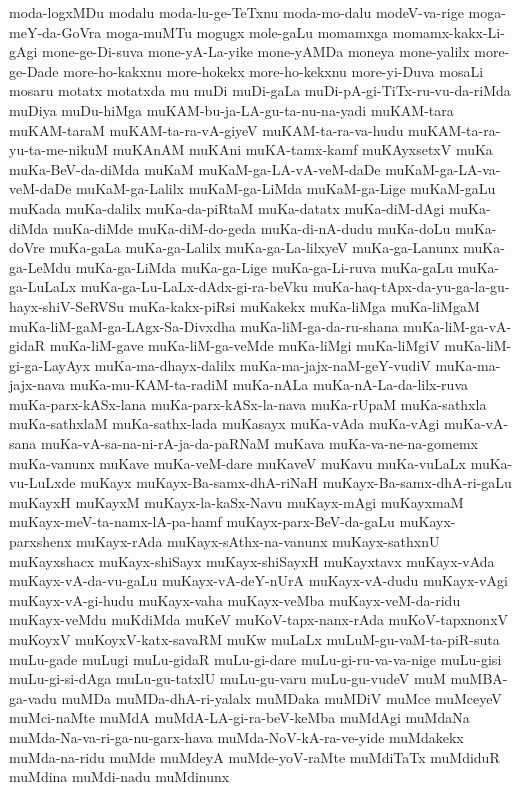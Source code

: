 {moda-logxMDu
modalu
moda-lu-ge-TeTxnu
moda-mo-dalu
modeV-va-rige
moga-meY-da-GoVra
moga-muMTu
mogugx
mole-gaLu
momamxga
momamx-kakx-Li-gAgi
mone-ge-Di-suva
mone-yA-La-yike
mone-yAMDa
moneya
mone-yalilx
more-ge-Dade
more-ho-kakxnu
more-hokekx
more-ho-kekxnu
more-yi-Duva
mosaLi
mosaru
motatx
motatxda
mu
muDi
muDi-gaLa
muDi-pA-gi-TiTx-ru-vu-da-riMda
muDiya
muDu-hiMga
muKAM-bu-ja-LA-gu-ta-nu-na-yadi
muKAM-tara
muKAM-taraM
muKAM-ta-ra-vA-giyeV
muKAM-ta-ra-va-hudu
muKAM-ta-ra-yu-ta-me-nikuM
muKAnAM
muKAni
muKA-tamx-kamf
muKAyxsetxV
muKa
muKa-BeV-da-diMda
muKaM
muKaM-ga-LA-vA-veM-daDe
muKaM-ga-LA-va-veM-daDe
muKaM-ga-Lalilx
muKaM-ga-LiMda
muKaM-ga-Lige
muKaM-gaLu
muKada
muKa-dalilx
muKa-da-piRtaM
muKa-datatx
muKa-diM-dAgi
muKa-diMda
muKa-diMde
muKa-diM-do-geda
muKa-di-nA-dudu
muKa-doLu
muKa-doVre
muKa-gaLa
muKa-ga-Lalilx
muKa-ga-La-lilxyeV
muKa-ga-Lanunx
muKa-ga-LeMdu
muKa-ga-LiMda
muKa-ga-Lige
muKa-ga-Li-ruva
muKa-gaLu
muKa-ga-LuLaLx
muKa-ga-Lu-LaLx-dAdx-gi-ra-beVku
muKa-haq-tApx-da-yu-ga-la-gu-hayx-shiV-SeRVSu
muKa-kakx-piRsi
muKakekx
muKa-liMga
muKa-liMgaM
muKa-liM-gaM-ga-LAgx-Sa-Divxdha
muKa-liM-ga-da-ru-shana
muKa-liM-ga-vA-gidaR
muKa-liM-gave
muKa-liM-ga-veMde
muKa-liMgi
muKa-liMgiV
muKa-liM-gi-ga-LayAyx
muKa-ma-dhayx-dalilx
muKa-ma-jajx-naM-geY-vudiV
muKa-ma-jajx-nava
muKa-mu-KAM-ta-radiM
muKa-nALa
muKa-nA-La-da-lilx-ruva
muKa-parx-kASx-lana
muKa-parx-kASx-la-nava
muKa-rUpaM
muKa-sathxla
muKa-sathxlaM
muKa-sathx-lada
muKasayx
muKa-vAda
muKa-vAgi
muKa-vA-sana
muKa-vA-sa-na-ni-rA-ja-da-paRNaM
muKava
muKa-va-ne-na-gomemx
muKa-vanunx
muKave
muKa-veM-dare
muKaveV
muKavu
muKa-vuLaLx
muKa-vu-LuLxde
muKayx
muKayx-Ba-samx-dhA-riNaH
muKayx-Ba-samx-dhA-ri-gaLu
muKayxH
muKayxM
muKayx-la-kaSx-Navu
muKayx-mAgi
muKayxmaM
muKayx-meV-ta-namx-lA-pa-hamf
muKayx-parx-BeV-da-gaLu
muKayx-parxshenx
muKayx-rAda
muKayx-sAthx-na-vanunx
muKayx-sathxnU
muKayxshacx
muKayx-shiSayx
muKayx-shiSayxH
muKayxtavx
muKayx-vAda
muKayx-vA-da-vu-gaLu
muKayx-vA-deY-nUrA
muKayx-vA-dudu
muKayx-vAgi
muKayx-vA-gi-hudu
muKayx-vaha
muKayx-veMba
muKayx-veM-da-ridu
muKayx-veMdu
muKdiMda
muKeV
muKoV-tapx-nanx-rAda
muKoV-tapxnonxV
muKoyxV
muKoyxV-katx-savaRM
muKw
muLaLx
muLuM-gu-vaM-ta-piR-suta
muLu-gade
muLugi
muLu-gidaR
muLu-gi-dare
muLu-gi-ru-va-va-nige
muLu-gisi
muLu-gi-si-dAga
muLu-gu-tatxlU
muLu-gu-varu
muLu-gu-vudeV
muM
muMBA-ga-vadu
muMDa
muMDa-dhA-ri-yalalx
muMDaka
muMDiV
muMce
muMceyeV
muMci-naMte
muMdA
muMdA-LA-gi-ra-beV-keMba
muMdAgi
muMdaNa
muMda-Na-va-ri-ga-nu-garx-hava
muMda-NoV-kA-ra-ve-yide
muMdakekx
muMda-na-ridu
muMde
muMdeyA
muMde-yoV-raMte
muMdiTaTx
muMdiduR
muMdina
muMdi-nadu
muMdinunx
}
